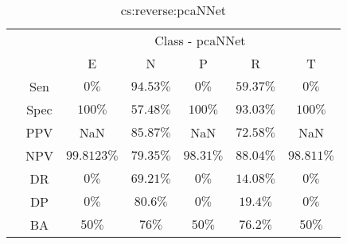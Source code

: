 \begin{table}[!ht]
	\centering
	\begin{tabular}{|c|c|c|c|c|c|c|}
		\cline{3-7}
		\multicolumn{2}{c|}{} & \multicolumn{5}{c|}{Class - pcaNNet} \\ \cline{3-7}
		\multicolumn{2}{c|}{} & E & N & P & R & T \\ \hline
		\multirow{7}{*}{\rotatebox{90}{Statistics}} & Sen & $0\%$ & $94.53\%$ & $0\%$ & $59.37\%$ & $0\%$ \\ \cline{2-7}
		 & Spec & $100\%$ & $57.48\%$ & $100\%$ & $93.03\%$ & $100\%$ \\ \cline{2-7}
		 & PPV & NaN & $85.87\%$ & NaN & $72.58\%$ & NaN \\ \cline{2-7}
		 & NPV & $99.8123\%$ & $79.35\%$ & $98.31\%$ & $88.04\%$ & $98.811\%$ \\ \cline{2-7}
		 & DR & $0\%$ & $69.21\%$ & $0\%$ & $14.08\%$ & $0\%$ \\ \cline{2-7}
		 & DP & $0\%$ & $80.6\%$ & $0\%$ & $19.4\%$ & $0\%$ \\ \cline{2-7}
		 & BA & $50\%$ & $76\%$ & $50\%$ & $76.2\%$ & $50\%$ \\ \hline
	\end{tabular}
	\caption{cs:reverse:pcaNNet}
	\label{tab:cs:reverse:pcaNNet}
\end{table}
